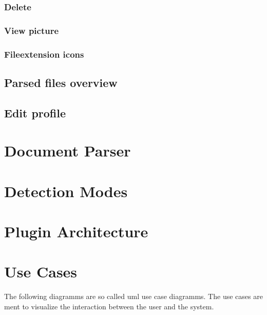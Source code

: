\subsubsection{Delete}
\subsubsection{View picture}
\subsubsection{Fileextension icons}
\subsection{Parsed files overview}
\subsection{Edit profile}

\section{Document Parser}

\section{Detection Modes}

\section{Plugin Architecture}

\section{Use Cases}
The following diagramms are so called uml use case diagramms. The use cases are ment to visualize the interaction between the user and the system.
\minisec{}


